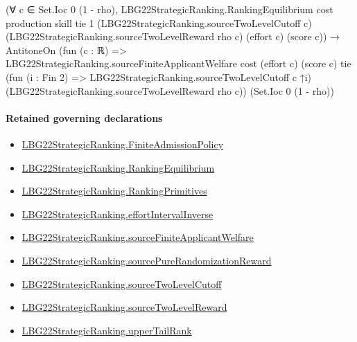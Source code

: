 \documentclass[10pt]{article}
\begin{document}
\begin{ReviewVerbatim}
                              (∀ c ∈ Set.Ioc 0 (1 - rho),
                                  LBG22StrategicRanking.RankingEquilibrium cost production skill tie 1
                                    (LBG22StrategicRanking.sourceTwoLevelCutoff c)
                                    (LBG22StrategicRanking.sourceTwoLevelReward rho c) (effort c) (score c)) →
                                AntitoneOn
                                  (fun (c : ℝ) =>
                                    LBG22StrategicRanking.sourceFiniteApplicantWelfare cost (effort c) (score c) tie
                                      (fun (i : Fin 2) => LBG22StrategicRanking.sourceTwoLevelCutoff c ↑i)
                                      (LBG22StrategicRanking.sourceTwoLevelReward rho c))
                                  (Set.Ioc 0 (1 - rho))
\end{ReviewVerbatim}

\paragraph{Retained governing declarations}
\begin{itemize}\raggedright
\item \hyperlink{paper-prerequisite-d056dd7c8060653c}{LBG22\allowbreak{}Strategic\allowbreak{}Ranking.\allowbreak{}Finite\allowbreak{}Admission\allowbreak{}Policy}
\item \hyperlink{paper-prerequisite-2a1b692f4e3136c6}{LBG22\allowbreak{}Strategic\allowbreak{}Ranking.\allowbreak{}Ranking\allowbreak{}Equilibrium}
\item \hyperlink{paper-prerequisite-9bbcc12f4a1736bf}{LBG22\allowbreak{}Strategic\allowbreak{}Ranking.\allowbreak{}Ranking\allowbreak{}Primitives}
\item \hyperlink{governing-declaration-c5b2c07abbff7224}{LBG22\allowbreak{}Strategic\allowbreak{}Ranking.\allowbreak{}effort\allowbreak{}Interval\allowbreak{}Inverse}
\item \hyperlink{paper-prerequisite-7fb5250e464d0736}{LBG22\allowbreak{}Strategic\allowbreak{}Ranking.\allowbreak{}source\allowbreak{}Finite\allowbreak{}Applicant\allowbreak{}Welfare}
\item \hyperlink{paper-prerequisite-366855b73d9ea1c5}{LBG22\allowbreak{}Strategic\allowbreak{}Ranking.\allowbreak{}source\allowbreak{}Pure\allowbreak{}Randomization\allowbreak{}Reward}
\item \hyperlink{paper-prerequisite-f88aac58507e44ca}{LBG22\allowbreak{}Strategic\allowbreak{}Ranking.\allowbreak{}source\allowbreak{}Two\allowbreak{}Level\allowbreak{}Cutoff}
\item \hyperlink{paper-prerequisite-30d97cd43eb79017}{LBG22\allowbreak{}Strategic\allowbreak{}Ranking.\allowbreak{}source\allowbreak{}Two\allowbreak{}Level\allowbreak{}Reward}
\item \hyperlink{governing-declaration-1f8a1d5f3261f80f}{LBG22\allowbreak{}Strategic\allowbreak{}Ranking.\allowbreak{}upper\allowbreak{}Tail\allowbreak{}Rank}
\end{itemize}
\end{document}
